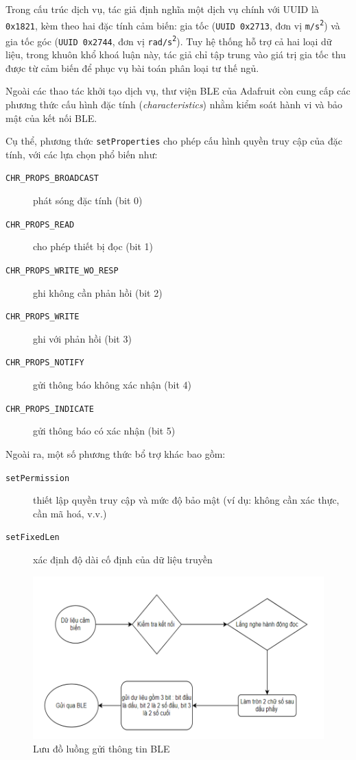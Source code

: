 Trong cấu trúc dịch vụ, tác giả định nghĩa một dịch vụ chính với UUID 
là \texttt{0x1821}, kèm theo hai đặc tính cảm biến: gia tốc 
(\texttt{UUID 0x2713}, đơn vị \texttt{m/s\textsuperscript{2}}) và 
gia tốc góc (\texttt{UUID 0x2744}, 
đơn vị \texttt{rad/s\textsuperscript{2}}). 
Tuy hệ thống hỗ trợ cả hai loại dữ liệu, trong khuôn khổ khoá luận này, 
tác giả chỉ tập trung vào giá trị gia tốc thu được từ cảm biến để phục 
vụ bài toán phân loại tư thế ngủ.



Ngoài các thao tác khởi tạo dịch vụ, thư viện BLE của Adafruit còn cung cấp các phương thức cấu hình đặc tính (\textit{characteristics}) nhằm kiểm soát hành vi và bảo mật của kết nối BLE.

Cụ thể, phương thức \texttt{setProperties} cho phép cấu hình quyền truy cập của đặc tính, với các lựa chọn phổ biến như:

\begin{description}
    \item[\texttt{CHR\_PROPS\_BROADCAST}] phát sóng đặc tính (bit 0)
    \item[\texttt{CHR\_PROPS\_READ}] cho phép thiết bị đọc (bit 1)
    \item[\texttt{CHR\_PROPS\_WRITE\_WO\_RESP}] ghi không cần phản hồi (bit 2)
    \item[\texttt{CHR\_PROPS\_WRITE}] ghi với phản hồi (bit 3)
    \item[\texttt{CHR\_PROPS\_NOTIFY}] gửi thông báo không xác nhận (bit 4)
    \item[\texttt{CHR\_PROPS\_INDICATE}] gửi thông báo có xác nhận (bit 5)
\end{description}

Ngoài ra, một số phương thức bổ trợ khác bao gồm:

\begin{description}
    \item[\texttt{setPermission}] thiết lập quyền truy cập và mức độ bảo mật (ví dụ: không cần xác thực, cần mã hoá, v.v.)
    \item[\texttt{setFixedLen}] xác định độ dài cố định của dữ liệu truyền
\end{description}

\begin{figure}[htbp]
    \centering
    \includegraphics[width=\textwidth]{images/sendBleFlow.png}
    \caption{Lưu đồ luồng gửi thông tin BLE}
    \label{sendBleFlow}
\end{figure}


